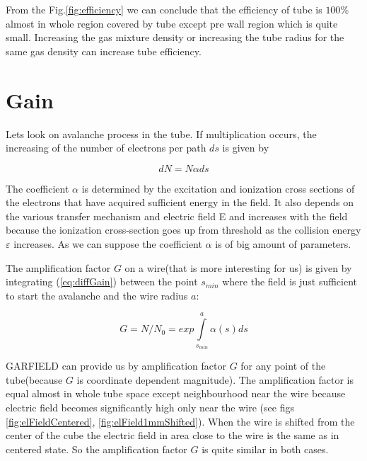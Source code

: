 \documentclass[12pt,a4paper]{article}
\begin{document}
	From the Fig.\ref{fig:efficiency} we can conclude that the efficiency of tube is $100\%$ almost in whole region covered by tube except pre wall region which is quite small. Increasing the gas mixture density or increasing the tube radius for the same gas density can increase tube efficiency.
	
		 
	\section{Gain}
	
	Lets look on avalanche process in the tube. If multiplication occurs, the increasing of the number of electrons per path $ds$ is given by
	
	\begin{equation}
		dN = N \alpha ds
		\label{eq:diffGain}
	\end{equation}
	
	The coefficient $\alpha$ is determined by the excitation and ionization cross sections of the electrons that have acquired sufficient energy in the field. It also depends on the various transfer mechanism and electric field E and increases with the field because the ionization cross-section goes up from threshold as the collision energy $\varepsilon$ increases. As we can suppose the coefficient $\alpha$ is of big amount of parameters.
	
	The amplification factor $G$ on a wire(that is more interesting for us) is given by integrating (\ref{eq:diffGain}) between the point $s_{min}$ where the field is just sufficient to start the avalanche and the wire radius $a$:
	
	\begin{equation}
	G = N/N_0 = exp \int\limits_{s_{min}}^{a} \alpha(s) ds
	\label{eq:gain}
	\end{equation}
	
	GARFIELD can provide us by amplification factor $G$ for any point of the tube(because  $G$ is coordinate dependent magnitude). The amplification factor is equal almost in whole tube space except neighbourhood near the wire because electric field  becomes significantly high only near the wire (see figs \ref{fig:elFieldCentered}, \ref{fig:elField1mmShifted}). When the wire is shifted from the center of the cube the electric field in area close to the wire is the same as in centered state. So the amplification factor $G$ is quite similar in both cases.
	
\end{document}
